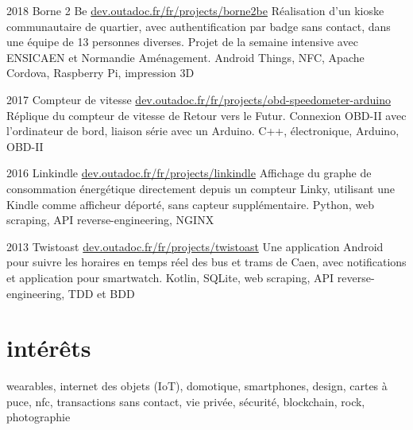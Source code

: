 \documentclass[]{friggeri-cv}
\begin{document}
\begin{entrylist}
	\entry
	{2018}
	{Borne 2 Be}
	{\href{https://dev.outadoc.fr/fr/projects/borne2be}{dev.outadoc.fr/fr/projects/borne2be}}
	{Réalisation d'un kioske communautaire de quartier, avec authentification par badge sans contact, dans une équipe de 13 personnes diverses. Projet de la semaine intensive avec ENSICAEN et Normandie Aménagement.}
	{Android Things, NFC, Apache Cordova, Raspberry Pi, impression 3D}
	
	\entry
	{2017}
	{Compteur de vitesse}
	{\href{https://dev.outadoc.fr/fr/projects/obd-speedometer-arduino}{dev.outadoc.fr/fr/projects/obd-speedometer-arduino}}
	{Réplique du compteur de vitesse de Retour vers le Futur. Connexion OBD-II avec l'ordinateur de bord, liaison série avec un Arduino.}
	{C++, électronique, Arduino, OBD-II}
	
	\entry
	{2016}
	{Linkindle}
	{\href{https://dev.outadoc.fr/fr/projects/linkindle}{dev.outadoc.fr/fr/projects/linkindle}}
	{Affichage du graphe de consommation énergétique directement depuis un compteur Linky, utilisant une Kindle comme afficheur déporté, sans capteur supplémentaire.}
	{Python, web scraping, API reverse-engineering, NGINX}
    
    \entry
    {2013}
    {Twistoast}
    {\href{https://dev.outadoc.fr/fr/projects/twistoast}{dev.outadoc.fr/fr/projects/twistoast}}
    {Une application Android pour suivre les horaires en temps réel des bus et trams de Caen, avec notifications et application pour smartwatch.}
    {Kotlin, SQLite, web scraping, API reverse-engineering, TDD et BDD}
\end{entrylist}

\section{intérêts}

wearables, internet des objets (IoT), domotique, smartphones, design, cartes à puce, nfc, transactions sans contact, vie privée, sécurité, blockchain, rock, photographie
\end{document}
